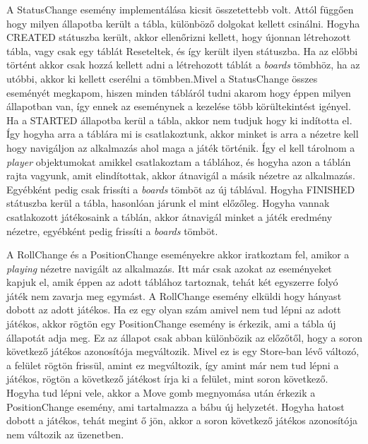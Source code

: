 \documentclass[a4paper,twoside]{article}
\begin{document}
A StatusChange esemény implementálása kicsit összetettebb volt. Attól függően hogy milyen állapotba került a tábla, különböző dolgokat kellett csinálni. Hogyha CREATED státuszba került, akkor ellenőrizni kellett, hogy újonnan létrehozott tábla, vagy csak egy táblát Reseteltek, és így került ilyen státuszba. Ha az előbbi történt akkor csak hozzá kellett adni a létrehozott táblát a \textit{boards} tömbhöz, ha az utóbbi, akkor ki kellett cserélni a tömbben.Mivel a StatusChange összes eseményét megkapom, hiszen minden tábláról tudni akarom hogy éppen milyen állapotban van, így ennek az eseménynek a kezelése több körültekintést igényel. Ha a STARTED állapotba kerül a tábla, akkor nem tudjuk hogy ki indította el. Így hogyha arra a táblára mi is csatlakoztunk, akkor minket is arra a nézetre kell hogy navigáljon az alkalmazás ahol maga a játék történik. Így el kell tárolnom a \textit{player} objektumokat amikkel csatlakoztam a táblához, és hogyha azon a táblán rajta vagyunk, amit elindítottak, akkor átnavigál a másik nézetre az alkalmazás. Egyébként pedig csak frissíti a \textit{boards} tömböt az új táblával. Hogyha FINISHED státuszba kerül a tábla, hasonlóan járunk el mint előzőleg. Hogyha vannak csatlakozott játékosaink a táblán, akkor átnavigál minket a játék eredmény nézetre, egyébként pedig frissíti a \textit{boards} tömböt. 

A RollChange és a PositionChange eseményekre akkor iratkoztam fel, amikor a \textit{playing} nézetre navigált az alkalmazás. Itt már csak azokat az eseményeket kapjuk el, amik éppen az adott táblához tartoznak, tehát két egyszerre folyó játék nem zavarja meg egymást. A RollChange esemény elküldi hogy hányast dobott az adott játékos. Ha ez egy olyan szám amivel nem tud lépni az adott játékos, akkor rögtön egy PositionChange esemény is érkezik, ami a tábla új állapotát adja meg. Ez az állapot csak abban különbözik az előzőtől, hogy a soron következő játékos azonosítója megváltozik. Mivel ez is egy Store-ban lévő változó, a felület rögtön frissül, amint ez megváltozik, így amint már nem tud lépni a játékos, rögtön a következő játékost írja ki a felület, mint soron következő. Hogyha tud lépni vele, akkor a Move gomb megnyomása után érkezik a PositionChange esemény, ami tartalmazza a bábu új helyzetét. Hogyha hatost dobott a játékos, tehát megint ő jön, akkor a soron következő játékos azonosítója nem változik az üzenetben.  
\end{document}
